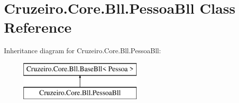 \hypertarget{class_cruzeiro_1_1_core_1_1_bll_1_1_pessoa_bll}{}\section{Cruzeiro.\+Core.\+Bll.\+Pessoa\+Bll Class Reference}
\label{class_cruzeiro_1_1_core_1_1_bll_1_1_pessoa_bll}
Inheritance diagram for Cruzeiro.\+Core.\+Bll.\+Pessoa\+Bll\+:\begin{figure}[H]
\begin{center}
\leavevmode
\includegraphics[height=2.000000cm]{class_cruzeiro_1_1_core_1_1_bll_1_1_pessoa_bll}
\end{center}
\end{figure}
